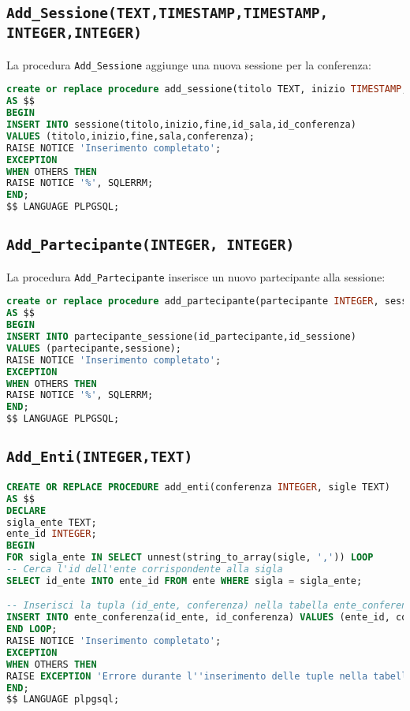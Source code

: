 \subsection{\texttt{Add\_Sessione(TEXT,TIMESTAMP,TIMESTAMP, INTEGER,INTEGER)}}
La procedura \texttt{Add\_Sessione} aggiunge una nuova sessione per la conferenza:
\begin{lstlisting}[language=SQL, style=mystyle]
create or replace procedure add_sessione(titolo TEXT, inizio TIMESTAMP, fine TIMESTAMP, sala INTEGER, conferenza INTEGER)
AS $$
BEGIN
INSERT INTO sessione(titolo,inizio,fine,id_sala,id_conferenza)
VALUES (titolo,inizio,fine,sala,conferenza);
RAISE NOTICE 'Inserimento completato';
EXCEPTION
WHEN OTHERS THEN
RAISE NOTICE '%', SQLERRM;
END;
$$ LANGUAGE PLPGSQL;
\end{lstlisting}
\subsection{\texttt{Add\_Partecipante(INTEGER, INTEGER)}}
La procedura \texttt{Add\_Partecipante} inserisce un nuovo partecipante alla sessione:
\begin{lstlisting}[language=SQL, style=mystyle]
create or replace procedure add_partecipante(partecipante INTEGER, sessione INTEGER)
AS $$
BEGIN
INSERT INTO partecipante_sessione(id_partecipante,id_sessione)
VALUES (partecipante,sessione);
RAISE NOTICE 'Inserimento completato';
EXCEPTION
WHEN OTHERS THEN
RAISE NOTICE '%', SQLERRM;
END;
$$ LANGUAGE PLPGSQL;
\end{lstlisting}
\subsection{\texttt{Add\_Enti(INTEGER,TEXT)}}
\begin{lstlisting}[language=SQL,style=mystyle]
CREATE OR REPLACE PROCEDURE add_enti(conferenza INTEGER, sigle TEXT)
AS $$
DECLARE
sigla_ente TEXT;
ente_id INTEGER;
BEGIN
FOR sigla_ente IN SELECT unnest(string_to_array(sigle, ',')) LOOP
-- Cerca l'id dell'ente corrispondente alla sigla
SELECT id_ente INTO ente_id FROM ente WHERE sigla = sigla_ente;

-- Inserisci la tupla (id_ente, conferenza) nella tabella ente_conferenza
INSERT INTO ente_conferenza(id_ente, id_conferenza) VALUES (ente_id, conferenza);
END LOOP;
RAISE NOTICE 'Inserimento completato';
EXCEPTION
WHEN OTHERS THEN
RAISE EXCEPTION 'Errore durante l''inserimento delle tuple nella tabella ente_conferenza: %', SQLERRM;
END;
$$ LANGUAGE plpgsql;
\end{lstlisting}
